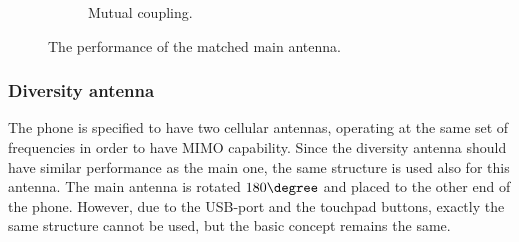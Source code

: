 \begin{figure}[H]
\begin{subfigure}[b]{0.49\textwidth}
        \caption{Mutual coupling.}
        \label{fig:main_final_res_match_coup}
    \end{subfigure}
    \caption{The performance of the matched main antenna.}
    \vspace{-15pt}
\end{figure}


\subsubsection{Diversity antenna}
\label{sec:diversity}
The phone is specified to have two cellular antennas, operating at the same set of frequencies in order to have MIMO capability. Since the diversity antenna should have similar performance as the main one, the same structure is used also for this antenna. The main antenna is rotated $180\degree$ and placed to the other end of the phone. However, due to the USB-port and the touchpad buttons, exactly the same structure cannot be used, but the basic concept remains the same.


